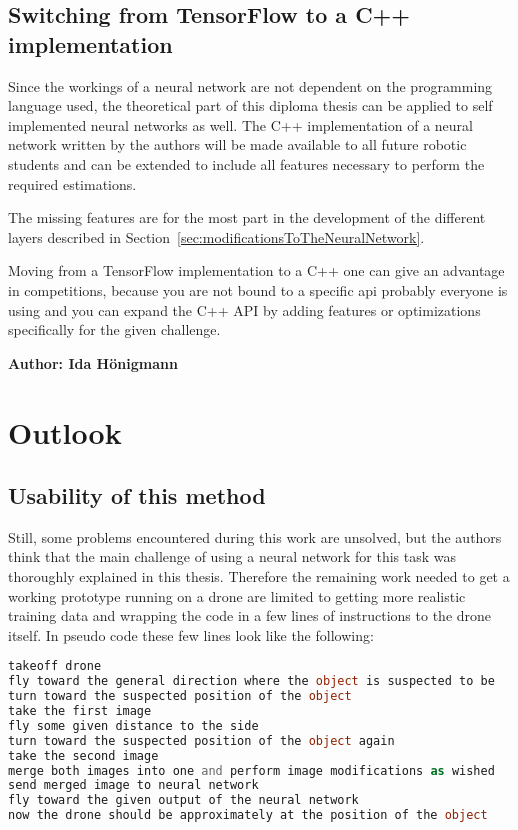 \subsection{Switching from TensorFlow to a C++ implementation}
Since the workings of a neural network are not dependent on the programming language used, the theoretical part of this diploma thesis can be applied to self implemented neural networks as well. The C++ implementation of a neural network written by the authors will be made available to all future robotic students and can be extended to include all features necessary to perform the required estimations.

The missing features are for the most part in the development of the different layers described in Section~\ref{sec:modificationsToTheNeuralNetwork}.

Moving from a TensorFlow implementation to a C++ one can give an advantage in competitions, because you are not bound to a specific api probably everyone is using and you can expand the C++ API by adding features or optimizations specifically for the given challenge.

\newpage

\vspace{5mm}
\noindent
\textbf{Author: Ida Hönigmann}

\section{Outlook}

\subsection{Usability of this method}

Still, some problems encountered during this work are unsolved, but the authors think that the main challenge of using a neural network for this task was thoroughly explained in this thesis. Therefore the remaining work needed to get a working prototype running on a drone are limited to getting more realistic training data and wrapping the code in a few lines of instructions to the drone itself. In pseudo code these few lines look like the following:


\begin{lstlisting}[language=PHP]	%actually pseudo code, but php shows no syntax highlighting
takeoff drone
fly toward the general direction where the object is suspected to be
turn toward the suspected position of the object
take the first image
fly some given distance to the side
turn toward the suspected position of the object again
take the second image
merge both images into one and perform image modifications as wished
send merged image to neural network
fly toward the given output of the neural network
now the drone should be approximately at the position of the object
\end{lstlisting}

